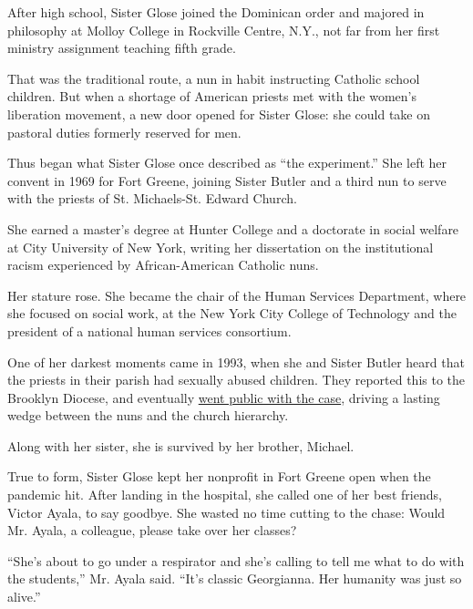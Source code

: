 After high school, Sister Glose joined the Dominican order and majored
in philosophy at Molloy College in Rockville Centre, N.Y., not far from
her first ministry assignment teaching fifth grade.

That was the traditional route, a nun in habit instructing Catholic
school children. But when a shortage of American priests met with the
women's liberation movement, a new door opened for Sister Glose: she
could take on pastoral duties formerly reserved for men.

Thus began what Sister Glose once described as ``the experiment.'' She
left her convent in 1969 for Fort Greene, joining Sister Butler and a
third nun to serve with the priests of St. Michaels-St. Edward Church.

She earned a master's degree at Hunter College and a doctorate in social
welfare at City University of New York, writing her dissertation on the
institutional racism experienced by African-American Catholic nuns.

Her stature rose. She became the chair of the Human Services Department,
where she focused on social work, at the New York City College of
Technology and the president of a national human services consortium.

One of her darkest moments came in 1993, when she and Sister Butler
heard that the priests in their parish had sexually abused children.
They reported this to the Brooklyn Diocese, and eventually
\href{https://www.nytimes3xbfgragh.onion/2002/03/15/nyregion/bitterness-in-brooklyn-diocese-over-abuse-case.html}{went
public with the case}, driving a lasting wedge between the nuns and the
church hierarchy.

Along with her sister, she is survived by her brother, Michael.

True to form, Sister Glose kept her nonprofit in Fort Greene open when
the pandemic hit. After landing in the hospital, she called one of her
best friends, Victor Ayala, to say goodbye. She wasted no time cutting
to the chase: Would Mr. Ayala, a colleague, please take over her
classes?

``She's about to go under a respirator and she's calling to tell me what
to do with the students,'' Mr. Ayala said. ``It's classic Georgianna.
Her humanity was just so alive.''

\href{https://www.nytimes3xbfgragh.onion/interactive/2020/obituaries/people-died-coronavirus-obituaries.html?action=click\&pgtype=Article\&state=default\&region=BELOW_MAIN_CONTENT\&context=covid_obits_promo}{}

